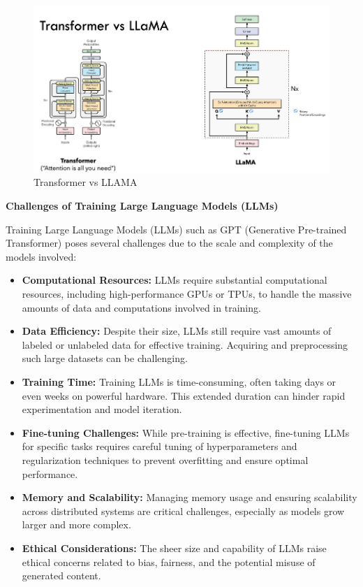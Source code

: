 \begin{figure}[h!]
	\centering
	\includegraphics[scale=0.5]{figures/llama.png}
	\caption{Transformer vs LLAMA}
\end{figure}

\hfill \break
\textbf{Challenges of Training Large Language Models (LLMs)}

Training Large Language Models (LLMs) such as GPT (Generative Pre-trained Transformer) poses several challenges due to the scale and complexity of the models involved:

\begin{itemize}
    \item \textbf{Computational Resources:} LLMs require substantial computational resources, including high-performance GPUs or TPUs, to handle the massive amounts of data and computations involved in training.
    
    \item \textbf{Data Efficiency:} Despite their size, LLMs still require vast amounts of labeled or unlabeled data for effective training. Acquiring and preprocessing such large datasets can be challenging.
    
    \item \textbf{Training Time:} Training LLMs is time-consuming, often taking days or even weeks on powerful hardware. This extended duration can hinder rapid experimentation and model iteration.
    
    \item \textbf{Fine-tuning Challenges:} While pre-training is effective, fine-tuning LLMs for specific tasks requires careful tuning of hyperparameters and regularization techniques to prevent overfitting and ensure optimal performance.
    
    \item \textbf{Memory and Scalability:} Managing memory usage and ensuring scalability across distributed systems are critical challenges, especially as models grow larger and more complex.
    
    \item \textbf{Ethical Considerations:} The sheer size and capability of LLMs raise ethical concerns related to bias, fairness, and the potential misuse of generated content.
\end{itemize}

